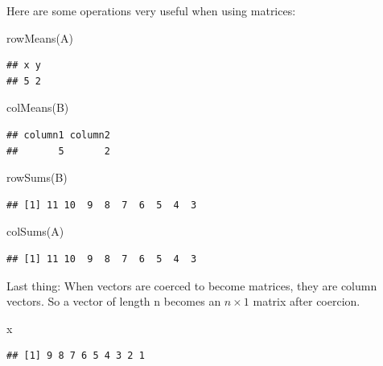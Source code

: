\documentclass[
]{book}
\newenvironment{Shaded}{\begin{snugshade}}{\end{snugshade}}
\newcommand{\FunctionTok}[1]{\textcolor[rgb]{0.00,0.00,0.00}{#1}}
\newcommand{\NormalTok}[1]{#1}
\theoremstyle{definition}
\theoremstyle{definition}
\theoremstyle{definition}
\theoremstyle{definition}
\theoremstyle{remark}
\begin{document}
Here are some operations very useful when using matrices:

\begin{Shaded}
\begin{Highlighting}[]
\FunctionTok{rowMeans}\NormalTok{(A)}
\end{Highlighting}
\end{Shaded}

\begin{verbatim}
## x y 
## 5 2
\end{verbatim}

\begin{Shaded}
\begin{Highlighting}[]
\FunctionTok{colMeans}\NormalTok{(B)}
\end{Highlighting}
\end{Shaded}

\begin{verbatim}
## column1 column2 
##       5       2
\end{verbatim}

\begin{Shaded}
\begin{Highlighting}[]
\FunctionTok{rowSums}\NormalTok{(B)}
\end{Highlighting}
\end{Shaded}

\begin{verbatim}
## [1] 11 10  9  8  7  6  5  4  3
\end{verbatim}

\begin{Shaded}
\begin{Highlighting}[]
\FunctionTok{colSums}\NormalTok{(A)}
\end{Highlighting}
\end{Shaded}

\begin{verbatim}
## [1] 11 10  9  8  7  6  5  4  3
\end{verbatim}

Last thing: When vectors are coerced to become matrices, they are column vectors. So a vector of length n becomes an \(n \times 1\) matrix after coercion.

\begin{Shaded}
\begin{Highlighting}[]
\NormalTok{x}
\end{Highlighting}
\end{Shaded}

\begin{verbatim}
## [1] 9 8 7 6 5 4 3 2 1
\end{verbatim}
\end{document}
